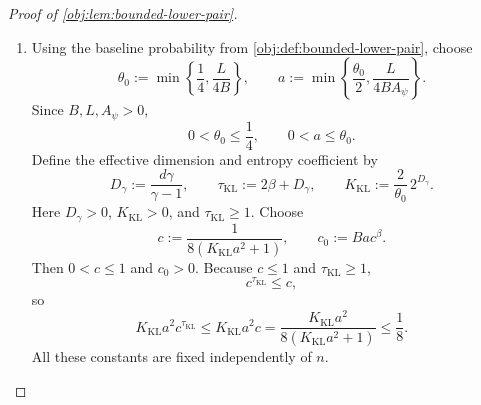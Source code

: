 \begin{proof}[Proof of \cref{obj:lem:bounded-lower-pair}]
\begin{enumerate}
For \(0<h\le1\), define the scaled bump by
\[
\psi_h(x):=h^\beta\psi((x-x_0)/h),
\qquad x\in\mathbb R^d.
\]
Translation and dilation give, for \(0\le\kappa\le m\),
\[
\mathrm d^\kappa\psi_h(x)
=h^\beta h^{-\kappa}\mathscr J_\kappa((x-x_0)/h),
\]
and hence
\[
\|\mathrm d^\kappa\psi_h(x)\|
\le h^{\beta-\kappa}M_{\psi,\kappa}
\le M_{\psi,\kappa}.
\]
For the top derivative, the preceding modulus bound yields
\[
\begin{aligned}
\|\mathrm d^m\psi_h(x)-\mathrm d^m\psi_h(x')\|
&\le h^{\beta-m}M_{\psi,\mathrm{mod}}
       \left(\frac{\|x-x'\|_\infty}{h}\right)^{\sigma_\beta}\\
&=M_{\psi,\mathrm{mod}}\|x-x'\|_\infty^{\sigma_\beta},
\end{aligned}
\]
since \(\beta-m=\sigma_\beta\). Set
\[
A_\psi:=
\max\left\{
1,\,
\max\left\{
\sum_{\kappa=0}^{m}M_{\psi,\kappa},
M_{\psi,\mathrm{mod}}
\right\}
\right\}>0.
\]
Coordinate derivatives are evaluations of these multilinear derivatives on coordinate unit vectors, so their magnitudes and differences are bounded by the corresponding operator norms. Restricting the ambient smooth functions to the cube supplies their continuous boundary traces. Therefore, with the convention of \cref{obj:def:holder},
\[
\psi_h|_{\mathcal X}\in\mathcal H^\beta(A_\psi)
\qquad
\text{for every }0<h\le1,
\quad \mathcal X=[0,1]^d.
\]

\item Using the baseline probability from \cref{obj:def:bounded-lower-pair}, choose
\[
\theta_0:=\min\left\{\frac14,\frac{L}{4B}\right\},
\qquad
a:=\min\left\{\frac{\theta_0}{2},\frac{L}{4BA_\psi}\right\}.
\]
Since \(B,L,A_\psi>0\),
\[
0<\theta_0\le\frac14,
\qquad
0<a\le\theta_0.
\]
Define the effective dimension and entropy coefficient by
\[
D_\gamma:=\frac{d\gamma}{\gamma-1},
\qquad
\tau_{\mathrm{KL}}:=2\beta+D_\gamma,
\qquad
K_{\mathrm{KL}}:=\frac{2}{\theta_0}\,2^{D_\gamma}.
\]
Here \(D_\gamma>0\), \(K_{\mathrm{KL}}>0\), and
\(\tau_{\mathrm{KL}}\ge1\). Choose
\[
c:=\frac{1}{8(K_{\mathrm{KL}}a^2+1)},
\qquad
c_0:=Bac^\beta.
\]
Then \(0<c\le1\) and \(c_0>0\). Because \(c\le1\) and
\(\tau_{\mathrm{KL}}\ge1\),
\[
c^{\tau_{\mathrm{KL}}}\le c,
\]
so
\[
K_{\mathrm{KL}}a^2c^{\tau_{\mathrm{KL}}}
\le K_{\mathrm{KL}}a^2c
=\frac{K_{\mathrm{KL}}a^2}{8(K_{\mathrm{KL}}a^2+1)}
\le\frac18.
\]
All these constants are fixed independently of \(n\).


\end{enumerate}
\end{proof}
